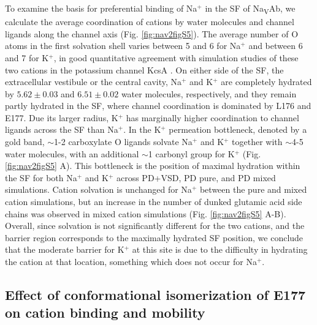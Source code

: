 \begin{refsection}
To examine the basis for preferential binding of Na$^+$ in the SF of Na\textsubscript{V}Ab, we calculate the average coordination of cations by water molecules and channel ligands along the channel axis (Fig. \ref{fig:nav2figS5}).  The average number of O atoms in the first solvation shell varies between 5 and 6 for Na$^+$ and between 6 and 7 for K$^+$, in good quantitative agreement with simulation studies of these two cations in the potassium channel KcsA \cite{Egwolf:2010ki}.  On either side of the SF, the extracellular vestibule or the central cavity, Na$^+$ and K$^+$ are completely hydrated by $5.62\pm0.03$ and $6.51\pm0.02$ water molecules, respectively, and they remain partly hydrated in the SF, where channel coordination is dominated by L176 and E177. Due its larger radius, K$^+$ has marginally higher coordination to channel ligands across the SF than Na$^+$. In the K$^+$ permeation bottleneck, denoted by a gold band, $\sim$1-2 carboxylate O ligands solvate Na$^+$ and K$^+$ together with $\sim$4-5 water molecules, with an additional $\sim$1 carbonyl group for K$^+$ (Fig. \ref{fig:nav2figS5} A). This bottleneck is the position of maximal hydration within the SF for both Na$^+$ and K$^+$ across PD+VSD, PD pure, and PD mixed simulations. Cation solvation is unchanged for Na$^+$ between the pure and mixed cation simulations, but an increase in the number of dunked glutamic acid side chains was observed in mixed cation simulations (Fig. \ref{fig:nav2figS5} A-B). Overall, since solvation is not significantly different for the two cations, and the barrier region corresponds to the maximally hydrated SF position, we conclude that the moderate barrier for K$^+$ at this site is due to the difficulty in hydrating the cation at that location, something which does not occur for Na$^+$. 

\subsection{Effect of conformational isomerization of E177 on cation binding and mobility }


\end{refsection}
